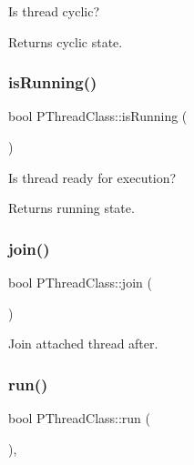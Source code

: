 Is thread cyclic? \begin{DoxyReturn}{Returns}
cyclic state. 
\end{DoxyReturn}
\mbox{\label{classPThreadClass_a4f88c65bb031c89b2b0efd31c1c37fc5}} 
\subsubsection{\texorpdfstring{is\+Running()}{isRunning()}}
{\footnotesize\ttfamily bool P\+Thread\+Class\+::is\+Running (\begin{DoxyParamCaption}{ }\end{DoxyParamCaption})\hspace{0.3cm}{\ttfamily [inline]}}

Is thread ready for execution? \begin{DoxyReturn}{Returns}
running state. 
\end{DoxyReturn}
\mbox{\label{classPThreadClass_afe4c0ea5bd3e1c89e01499bbca5e194d}} 
\subsubsection{\texorpdfstring{join()}{join()}}
{\footnotesize\ttfamily bool P\+Thread\+Class\+::join (\begin{DoxyParamCaption}{ }\end{DoxyParamCaption})\hspace{0.3cm}{\ttfamily [virtual]}}



Join attached thread after. 

\mbox{\label{classPThreadClass_a9e60b014b8e8ba6892cc322b6ba183d8}} 
\subsubsection{\texorpdfstring{run()}{run()}}
{\footnotesize\ttfamily bool P\+Thread\+Class\+::run (\begin{DoxyParamCaption}{ }\end{DoxyParamCaption})\hspace{0.3cm}{\ttfamily [virtual]}, {\ttfamily [noexcept]}}

